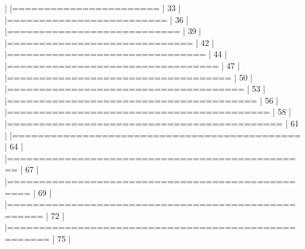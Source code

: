 \documentclass[a4paper,10pt]{article}
\begin{document}
\begin{Schunk}
\begin{Soutput}
  |                                                                            
  |=======================                                               |  33%
  |                                                                            
  |=========================                                             |  36%
  |                                                                            
  |===========================                                           |  39%
  |                                                                            
  |=============================                                         |  42%
  |                                                                            
  |===============================                                       |  44%
  |                                                                            
  |=================================                                     |  47%
  |                                                                            
  |===================================                                   |  50%
  |                                                                            
  |=====================================                                 |  53%
  |                                                                            
  |=======================================                               |  56%
  |                                                                            
  |=========================================                             |  58%
  |                                                                            
  |===========================================                           |  61%
  |                                                                            
  |=============================================                         |  64%
  |                                                                            
  |===============================================                       |  67%
  |                                                                            
  |=================================================                     |  69%
  |                                                                            
  |===================================================                   |  72%
  |                                                                            
  |====================================================                  |  75%
  |                                                                            

\end{Soutput}
\end{Schunk}
\end{document}
